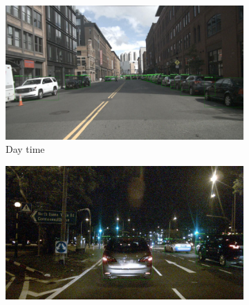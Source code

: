 \documentclass[report.tex]{subfiles}
\begin{document}
          
          

          \begin{figure}[ht]
            \centering
            \begin{subfigure}{0.3\textwidth}
                \centering
                \includegraphics[width=\linewidth]{images/datasets/nuscenes/samples/day_cam.png}
                \caption{Day time}
                \label{fig:day_cam}
            \end{subfigure}
            \hfill
            \begin{subfigure}{0.3\textwidth}
                \centering
                \includegraphics[width=\linewidth]{images/datasets/nuscenes/samples/night_cam.png}

\end{subfigure}
\end{figure}
\end{document}
